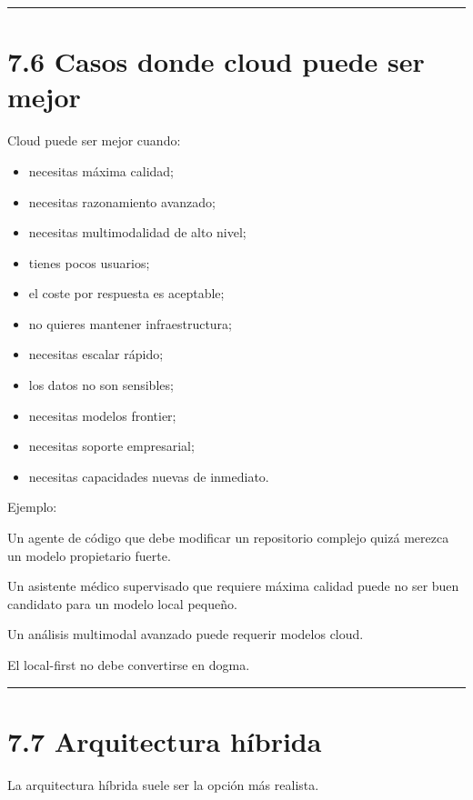 \begin{center}\rule{0.5\linewidth}{0.5pt}\end{center}

\section{7.6 Casos donde cloud puede ser
mejor}\label{casos-donde-cloud-puede-ser-mejor}

Cloud puede ser mejor cuando:

\begin{itemize}
\tightlist
\item
  necesitas máxima calidad;
\item
  necesitas razonamiento avanzado;
\item
  necesitas multimodalidad de alto nivel;
\item
  tienes pocos usuarios;
\item
  el coste por respuesta es aceptable;
\item
  no quieres mantener infraestructura;
\item
  necesitas escalar rápido;
\item
  los datos no son sensibles;
\item
  necesitas modelos frontier;
\item
  necesitas soporte empresarial;
\item
  necesitas capacidades nuevas de inmediato.
\end{itemize}

Ejemplo:

Un agente de código que debe modificar un repositorio complejo quizá
merezca un modelo propietario fuerte.

Un asistente médico supervisado que requiere máxima calidad puede no ser
buen candidato para un modelo local pequeño.

Un análisis multimodal avanzado puede requerir modelos cloud.

El local-first no debe convertirse en dogma.

\begin{center}\rule{0.5\linewidth}{0.5pt}\end{center}

\section{7.7 Arquitectura híbrida}\label{arquitectura-huxedbrida}

La arquitectura híbrida suele ser la opción más realista.

